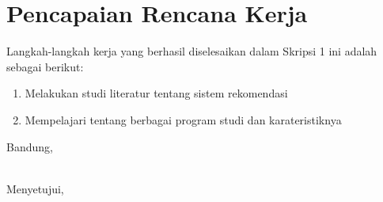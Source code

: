 \documentclass[a4paper,twoside]{article}
\begin{document}
\section{Pencapaian Rencana Kerja}
Langkah-langkah kerja yang berhasil diselesaikan dalam Skripsi 1 ini adalah sebagai berikut:
\begin{enumerate}
\item Melakukan studi literatur tentang sistem rekomendasi
\item Mempelajari tentang berbagai program studi dan karateristiknya
\end{enumerate}




\vspace{1cm}
\centering Bandung, \tanggal\\
\vspace{2cm} \nama \\ 
\vspace{1cm}

Menyetujui, \\
\end{document}
